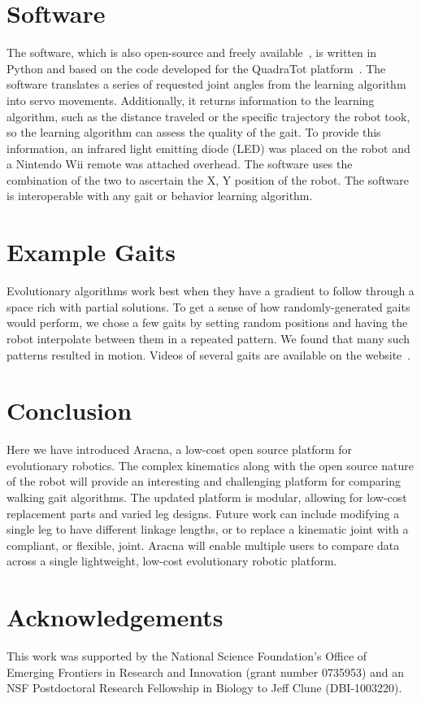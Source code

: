 \documentclass[letterpaper]{article}
\begin{document}
\section{Software}

The software, which is also open-source and freely available~\citep{WEB}, is written in Python and based on the
code developed for the QuadraTot platform~\citep{yosinski2011gaits}. The software translates a series of requested joint angles from the learning algorithm into servo movements. Additionally, it returns information to the learning algorithm, such as the distance traveled or the specific trajectory the robot took, so the learning algorithm can assess the quality of the gait. To provide this information, an infrared light
emitting diode (LED) was placed on the robot and a Nintendo Wii
remote was attached overhead. The software uses the combination of the two to ascertain the X, Y position of the robot. The software is interoperable with any gait or behavior learning algorithm.



\section{Example Gaits}

Evolutionary algorithms work best when they have a gradient to follow
through a space rich with partial solutions. To get a sense of how
randomly-generated gaits would perform, we chose a few gaits by
setting random positions and having the robot interpolate between them
in a repeated pattern. We found that many such patterns resulted in
motion. Videos of several gaits are available on the
website~\citep{WEB}.



\section{Conclusion}

Here we have introduced Aracna, a low-cost open source platform for
evolutionary robotics. The complex kinematics along with the open
source nature of the robot will provide an interesting and challenging
platform for comparing walking gait algorithms. The updated
platform is modular, allowing for low-cost replacement parts and
varied leg designs. Future work can include modifying a single leg to
have different linkage lengths, or to replace a kinematic joint with a
compliant, or flexible, joint.  Aracna will enable multiple users to
compare data across a single lightweight, low-cost evolutionary
robotic platform.



\section{Acknowledgements}

This work was supported by the National Science Foundation's Office of
Emerging Frontiers in Research and Innovation (grant number 0735953) and an NSF Postdoctoral Research Fellowship in Biology to Jeff Clune (DBI-1003220).



\footnotesize


\end{document}
